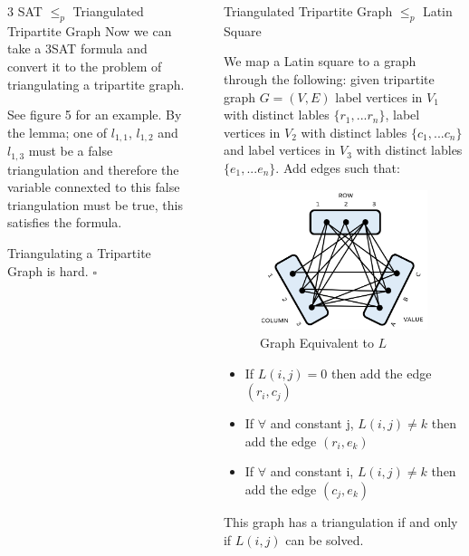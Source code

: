 \documentclass[final]{beamer}
\newlength{\sepwidth}
\newlength{\colwidth}
\newcounter{row}
\newcounter{col}
\newcounter{rowa}
\newcounter{cola}
\newcommand{\separatorcolumn}{\begin{column}{\sepwidth}\end{column}}
\newcommand\setrowa[3]{
  \setcounter{cola}{1}
  \foreach \n in {#1, #2, #3} {
    \edef\x{\value{cola} - 0.5}
    \edef\y{3.5 - \value{rowa}}
    \node[anchor=center] at (\x, \y) {\n};
    \stepcounter{cola}
  }
  \stepcounter{rowa}
}
\begin{document}
\begin{frame}[t]
\begin{columns}[t]
\begin{column}{\colwidth}
\begin{block}{3 SAT $\leq_p$ Triangulated Tripartite Graph \cite{doi:10.1137/0210054}}
Now we can take a 3SAT formula and convert it to the problem of triangulating a tripartite graph.

See figure 5 for an example. By the lemma; one of $l_{1,1}$, $l_{1,2}$ and $l_{1,3}$ must be a false triangulation and therefore the variable connexted to this false triangulation must be true, this satisfies the formula.

Triangulating a Tripartite Graph is hard. $\square$
  \end{block}

\end{column}

\separatorcolumn
\begin{column}{\colwidth}
 
  \begin{block}{Triangulated Tripartite Graph $\leq_p$ Latin Square \cite{COLBOURN198425}}

We map a Latin square to a graph through the following: given tripartite graph $G=(V,E)$ label vertices in $V_1$ with distinct lables $\{r_1,...r_n\}$, label vertices in $V_2$ with distinct lables $\{c_1,...c_n\}$ and label vertices in $V_3$ with distinct lables $\{e_1,...e_n\}$. Add edges such that:
\begin{figure}
\end{figure}
\begin{figure}
		\vspace{-50pt}
		\includegraphics[width=50mm]{ttg.png}
		\caption{Graph Equivalent to $L$}
		\vspace{-30pt}
\end{figure}

\begin{itemize}
\item{If $L(i,j) = 0$ then add the edge $(r_i,c_j)$ }
\item{If $\forall$ and constant j, $L(i,j) \neq k$ then add the edge $(r_i,e_k)$}
\item{If $\forall$ and constant i, $L(i,j) \neq k$ then add the edge $(c_j,e_k)$}
\end{itemize}
This graph has a triangulation if and only if $L(i,j)$ can be solved.


\end{block}
\end{column}
\end{columns}
\end{frame}
\end{document}
